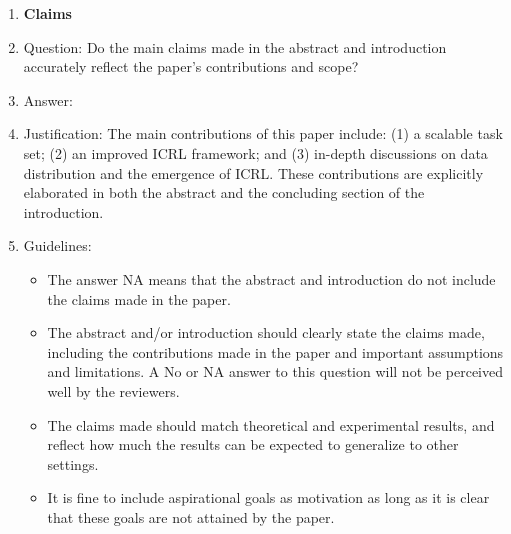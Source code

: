 \documentclass{article}
\begin{document}


\begin{enumerate}

\item {\bf Claims}
    \item[] Question: Do the main claims made in the abstract and introduction accurately reflect the paper's contributions and scope?
    \item[] Answer: \answerYes{} %
    \item[] Justification: The main contributions of this paper include: (1) a scalable task set; (2) an improved ICRL framework; and (3) in-depth discussions on data distribution and the emergence of ICRL. These contributions are explicitly elaborated in both the abstract and the concluding section of the introduction.
    \item[] Guidelines: 
    \begin{itemize}
        \item The answer NA means that the abstract and introduction do not include the claims made in the paper.
        \item The abstract and/or introduction should clearly state the claims made, including the contributions made in the paper and important assumptions and limitations. A No or NA answer to this question will not be perceived well by the reviewers. 
        \item The claims made should match theoretical and experimental results, and reflect how much the results can be expected to generalize to other settings. 
        \item It is fine to include aspirational goals as motivation as long as it is clear that these goals are not attained by the paper. 
    \end{itemize}


\end{enumerate}
\end{document}
